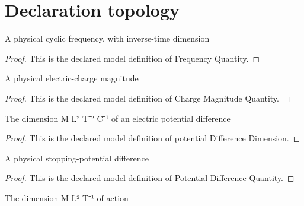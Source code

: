 \section{Declaration topology}
\begin{definition}
  \label{def:physics:phyx-mini-0515:phyxminiproblems-problemphyxmini0515-frequencyquantity}
  A physical cyclic frequency, with inverse-time dimension
\end{definition}
\begin{proof}
  This is the declared model definition of Frequency Quantity.
\end{proof}
\begin{definition}
  \label{def:physics:phyx-mini-0515:phyxminiproblems-problemphyxmini0515-chargemagnitudequantity}
  A physical electric-charge magnitude
\end{definition}
\begin{proof}
  This is the declared model definition of Charge Magnitude Quantity.
\end{proof}
\begin{definition}
  \label{def:physics:phyx-mini-0515:phyxminiproblems-problemphyxmini0515-potentialdifferencedimension}
  The dimension M L² T⁻² C⁻¹ of an electric potential difference
\end{definition}
\begin{proof}
  This is the declared model definition of potential Difference Dimension.
\end{proof}
\begin{definition}
  \label{def:physics:phyx-mini-0515:phyxminiproblems-problemphyxmini0515-potentialdifferencequantity}
  A physical stopping-potential difference
\end{definition}
\begin{proof}
  This is the declared model definition of Potential Difference Quantity.
\end{proof}
\begin{definition}
  \label{def:physics:phyx-mini-0515:phyxminiproblems-problemphyxmini0515-actiondimension}
  The dimension M L² T⁻¹ of action
\end{definition}
